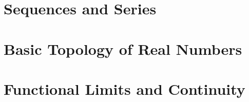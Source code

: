 \documentclass[12pt, oneside]{book}
\begin{document}

% 

\setcounter{chapter}{1}
\chapter{Sequences and Series}\label{sequences and series}
\vspace*{-0.25in}


\chapter{Basic Topology of Real Numbers}\label{topology}
\vspace*{-0.25in}


\chapter{Functional Limits and Continuity}\label{functional limits}
\vspace*{-0.25in}






% 

% 

\end{document}
